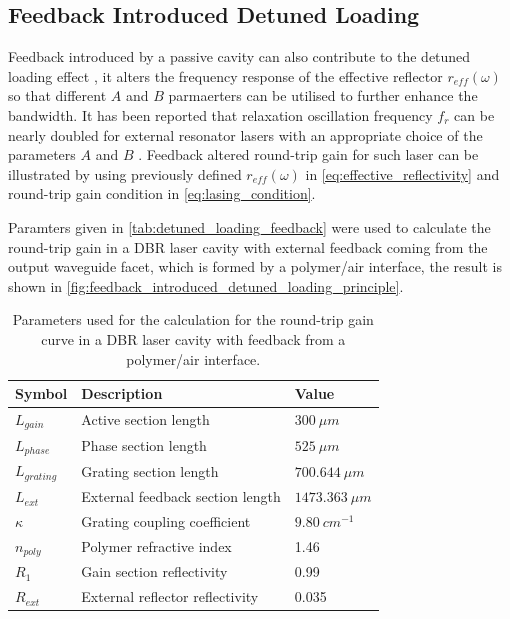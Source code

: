 \subsection{Feedback Introduced Detuned Loading}\label{subsec:feedback_introduced_detuned_loading}
Feedback introduced by a passive cavity can also contribute to the detuned loading effect \cite{vahala1984detuned, vahala1985observation}, it alters the frequency response of the effective reflector $r_{eff}(\omega)$ so that different $A$ and $B$ parmaerters can be utilised to further enhance the bandwidth. It has been reported that relaxation oscillation frequency $f_r$ can be nearly doubled for external resonator lasers with an appropriate choice of the parameters $A$ and $B$ \cite{ vahala1984detuned, agrawal1988modulation, vahala1985observation}. Feedback altered round-trip gain for such laser can be illustrated by using previously defined $r_{eff}(\omega)$ in \autoref{eq:effective_reflectivity} and round-trip gain condition in \autoref{eq:lasing_condition}.

Paramters given in \autoref{tab:detuned_loading_feedback} were used to calculate the round-trip gain in a DBR laser cavity with external feedback coming from the output waveguide facet, which is formed by a polymer/air interface, the result is shown in \autoref{fig:feedback_introduced_detuned_loading_principle}.

\begin{table}[ht]
    \centering
    \caption{Parameters used for the calculation for the round-trip gain curve in a DBR laser cavity with feedback from a polymer/air interface.}
    \label{tab:detuned_loading_feedback}
    \begin{tabular}{@{}lll@{}}
    \toprule
    Symbol          & Description                      & Value             \\ \midrule
    $L_{gain}$      & Active section length            & $300 \ \mu m$     \\
    $L_{phase}$     & Phase section length             & $525 \ \mu m$     \\
    $L_{grating}$   & Grating section length           & $700.644\ \mu m$  \\
    $L_{ext}$       & External feedback section length & $1473.363\ \mu m$ \\
    $\kappa$        & Grating coupling coefficient     & $9.80 \ cm^{-1}$  \\
    $n_{poly}$      & Polymer refractive index         & 1.46              \\
    $R_1$           & Gain section reflectivity        & 0.99              \\
    $R_{ext}$       & External reflector reflectivity  & 0.035             \\ \bottomrule
    \end{tabular}
\end{table}

